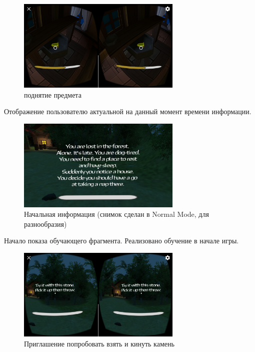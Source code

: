 \begin{figure}[h!]
    \centering
    \includegraphics[width=0.7\textwidth]{./screenshots/pick_up_bell.jpg}
    \caption{поднятие предмета}
    \label{pick_up}
\end{figure}

Отображение пользователю актуальной на данный момент времени информации.

\begin{figure}[h!]
    \centering
    \includegraphics[width=0.7\textwidth]{./screenshots/info_normal.jpg}
    \caption{Начальная информация (снимок сделан в Normal Mode, для разнообразия)}
    \label{info_normal}
\end{figure}

Начало показа обучающего фрагмента. Реализовано обучение в начале игры.

\begin{figure}[h!]
    \centering
    \includegraphics[width=0.7\textwidth]{./screenshots/try.jpg}
    \caption{Приглашение попробовать взять и кинуть камень}
    \label{try}
\end{figure}













